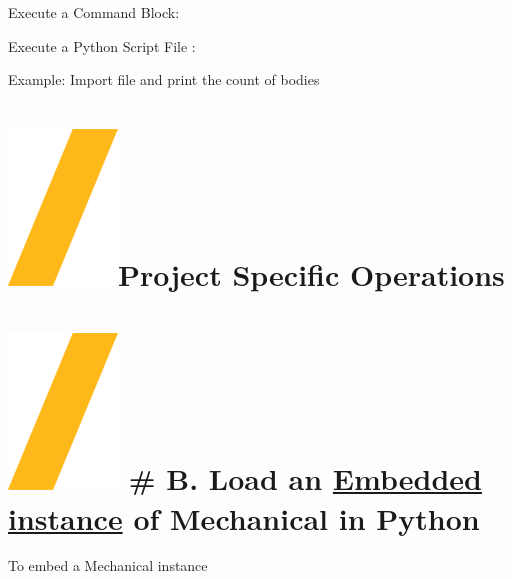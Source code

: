 \documentclass[9pt,landscape]{article}
\begin{document}
\begin{multicols}{3}

Execute a Command Block:


Execute a Python Script File :


Example: Import file and print the count of bodies




\section{\includegraphics[height=\fontcharht\font`\S]{slash.png}Project Specific Operations}



\section{\includegraphics[height=\fontcharht\font`\S]{slash.png} # B. Load an  \underline{Embedded instance}  of Mechanical in Python}
To embed a Mechanical instance


\end{multicols}
\end{document}
